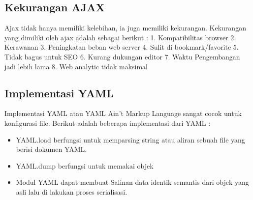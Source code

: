 \documentclass[a4paper]{article}
\begin{document}
\subsection{Kekurangan AJAX}
Ajax tidak hanya memiliki kelebihan, ia juga memiliki kekurangan. Kekurangan yang dimiliki oleh ajax adalah sebagai berikut :
1.	Kompatibilitas browser
2.	Kerawanan
3.	Peningkatan beban web server
4.	Sulit di bookmark/favorite
5.	Tidak bagus untuk SEO
6.	Kurang dukungan editor
7.	Waktu Pengembangan jadi lebih lama
8.	Web analytic tidak maksimal

\subsection{Implementasi YAML}
Implementasi YAML atau YAML Ain’t Markup Language sangat cocok untuk konfigurasi file.
Berikut adalah beberapa implementasi dari YAML :
\begin{itemize}
\item YAML.load berfungsi untuk memparsing string atau aliran sebuah file yang berisi dokumen YAML.
\item YAML.dump berfungsi untuk memakai objek 
\item Modul YAML dapat membuat Salinan data identik semantis dari objek yang asli lalu di lakukan proses serialisasi.

\end{itemize}
\end{document}
